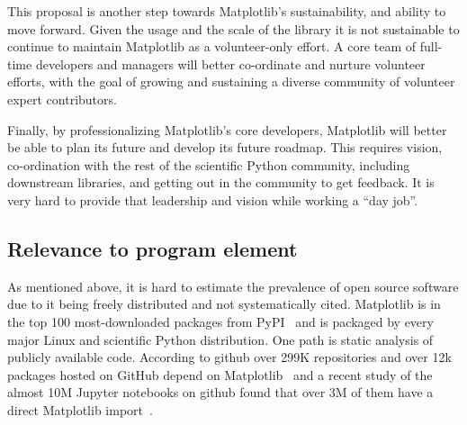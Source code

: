 \documentclass[12pt]{article}
\numberwithin{page}{section}
\begin{document}
This proposal is another step towards Matplotlib's sustainability, and
ability to move forward. Given the usage and the scale of the library
it is not sustainable to continue to maintain Matplotlib as a
volunteer-only effort.  A core team of full-time developers and
managers will better co-ordinate and nurture volunteer efforts, with
the goal of growing and sustaining a diverse community of volunteer
expert contributors.

Finally, by professionalizing Matplotlib's core developers, Matplotlib
will better be able to plan its future and develop its future roadmap.
This requires vision, co-ordination with the rest of the scientific
Python community, including downstream libraries, and getting out in
the community to get feedback.  It is very hard to provide that
leadership and vision while working a ``day job''.

\subsection{Relevance to program element}

As mentioned above, it is hard to estimate the prevalence of open
source software due to it being freely distributed and not
systematically cited.  Matplotlib is in the top 100 most-downloaded
packages from PyPI~\cite{pypi_stats} and is packaged by every major
Linux and scientific Python distribution.  One path is static analysis
of publicly available code.  According to github over 299K
repositories and over 12k packages hosted on GitHub depend on
Matplotlib~\cite{gh_deps:2021} and a recent study of the almost 10M
Jupyter notebooks on github found that over 3M of them have a direct
Matplotlib import~\cite{datalore:2020}.
\end{document}
